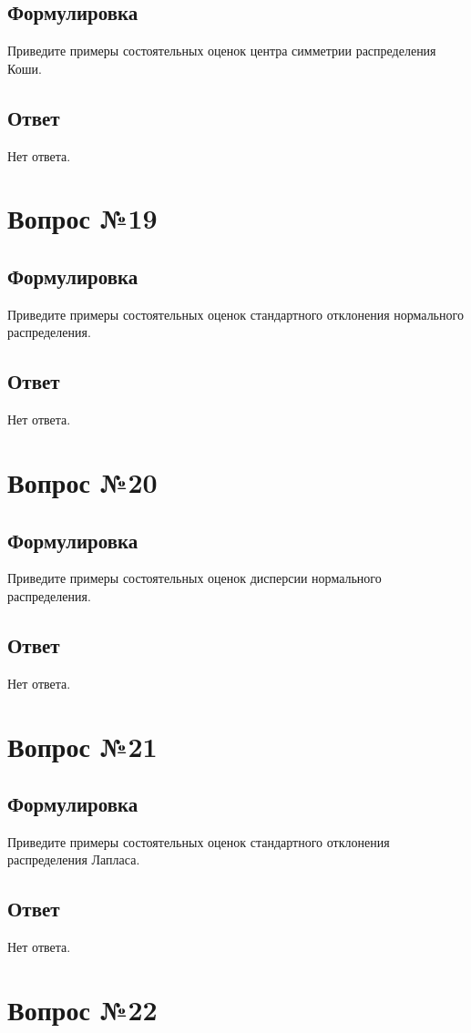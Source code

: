\documentclass[a4]{article}
\begin{document}
	\subsection*{Формулировка}
	Приведите примеры состоятельных оценок центра симметрии распределения Коши.
	\subsection*{Ответ}
	Нет ответа.
	
	\section{Вопрос №19}
	\subsection*{Формулировка}
	Приведите примеры состоятельных оценок стандартного отклонения нормального
распределения.
	\subsection*{Ответ}
	Нет ответа.
	
	\section{Вопрос №20}
	\subsection*{Формулировка}
	Приведите примеры состоятельных оценок дисперсии нормального распределения.
	\subsection*{Ответ}
	Нет ответа.
	
	\section{Вопрос №21}
	\subsection*{Формулировка}
	Приведите примеры состоятельных оценок стандартного отклонения распределения
Лапласа.
	\subsection*{Ответ}
	Нет ответа.
	
	\section{Вопрос №22}
\end{document}
